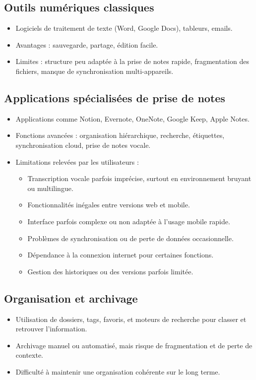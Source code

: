 \subsection{Outils numériques classiques}
\begin{itemize}
    \item Logiciels de traitement de texte (Word, Google Docs), tableurs, emails.
    \item Avantages : sauvegarde, partage, édition facile.
    \item Limites : structure peu adaptée à la prise de notes rapide, fragmentation des fichiers, manque de synchronisation multi-appareils.
\end{itemize}

\subsection{Applications spécialisées de prise de notes}
\begin{itemize}
    \item Applications comme Notion, Evernote, OneNote, Google Keep, Apple Notes.
    \item Fonctions avancées : organisation hiérarchique, recherche, étiquettes, synchronisation cloud, prise de notes vocale.
    \item Limitations relevées par les utilisateurs :
    \begin{itemize}
        \item Transcription vocale parfois imprécise, surtout en environnement bruyant ou multilingue.
        \item Fonctionnalités inégales entre versions web et mobile.
        \item Interface parfois complexe ou non adaptée à l’usage mobile rapide.
        \item Problèmes de synchronisation ou de perte de données occasionnelle.
        \item Dépendance à la connexion internet pour certaines fonctions.
        \item Gestion des historiques ou des versions parfois limitée.
    \end{itemize}
\end{itemize}

\subsection{Organisation et archivage}
\begin{itemize}
    \item Utilisation de dossiers, tags, favoris, et moteurs de recherche pour classer et retrouver l’information.
    \item Archivage manuel ou automatisé, mais risque de fragmentation et de perte de contexte.
    \item Difficulté à maintenir une organisation cohérente sur le long terme.
\end{itemize}

